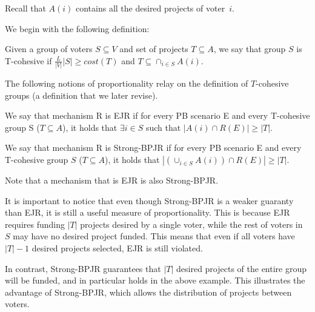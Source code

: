\documentclass[runningheads]{llncs}
\begin{document}
Recall that $A(i)$ contains all the desired projects of voter~$i$.

We begin with the following definition:

\begin{definition} Given a group of voters $S\subseteq V$ and set of projects $T\subseteq A$, we say that group $S$ is T-cohesive if $\frac{L}{|V|}|S|\geq cost(T)$ and $T\subseteq \cap_{i\in S}A(i)$.
\end{definition}\label{def:tco}

The following notions of proportionality relay on the definition of $T$-cohesive groups (a definition that we later revise). 

\begin{definition}  We say that mechanism R is EJR if for every PB scenario E and every T-cohesive group S ($T\subseteq A$), it holds that $\exists i\in S $ such that $|A(i)\cap R(E)|\geq |T|$.
\end{definition}

\begin{definition}
 We say that mechanism R is Strong-BPJR if for every PB scenario E and every T-cohesive group $S$ ($T\subseteq A$), it holds that  $|(\cup_{i\in S}A(i))\cap R(E)|\geq |T|$. 
\end{definition}
Note  that a mechanism that is  EJR is also Strong-BPJR. 

It is important to notice that  even though Strong-BPJR is a weaker guaranty than EJR, it is still a useful measure of proportionality. This is because  EJR requires funding $|T|$ projects desired by a single voter, while the rest of voters in $S$ may have no desired project funded.
This means that even if all voters have $|T|-1$ desired projects selected, EJR is still violated.

In contrast, Strong-BPJR guarantees that $|T|$ desired projects of the entire group will be funded, and in particular holds in the above example. 
 This illustrates the advantage of Strong-BPJR, which allows the distribution of projects between voters.
\end{document}
